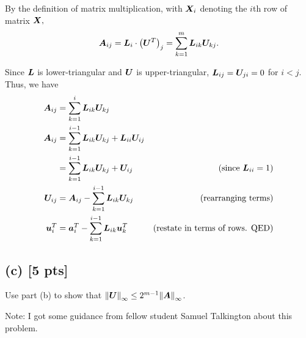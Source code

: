 \documentclass[twoside,10pt]{article}
\begin{document}
By the definition of matrix multiplication, with $\bm{X}_i$ denoting the $i$th row of matrix $\bm{X},$
$$\mtx{A}_{ij} = \mtx{L}_i\cdot\left(\mtx{U}^T\right)_j = \sum_{k=1}^m \mtx{L}_{ik}\mtx{U}_{kj}.$$

Since $\bm{L}$ is lower-triangular and $\bm{U}$ is upper-triangular, $\bm{L}_{ij} = \bm{U}_{ji} = 0$ for $i < j.$
Thus, we have
\begin{align*}
  \bm{A}_{ij} &= \sum_{k=1}^{i} \bm{L}_{ik}\bm{U}_{kj}\\
  \bm{A}_{ij} &= \sum_{k=1}^{i-1} \bm{L}_{ik}\bm{U}_{kj} + \bm{L}_{ii}\bm{U}_{ij}\\
  &= \sum_{k=1}^{i-1} \bm{L}_{ik}\bm{U}_{kj} + \bm{U}_{ij}&\text{(since $\bm{L}_{ii} = 1$)}\\
  \bm{U}_{ij} &= \bm{A}_{ij} - \sum_{k=1}^{i-1} \bm{L}_{ik}\bm{U}_{kj}&\text{(rearranging terms)}\\
  \bm{u}^T_{i} &= \bm{a}^T_{i} - \sum_{k=1}^{i-1} \bm{L}_{ik}\bm{u}^T_{k}&\text{(restate in terms of rows. QED)}
\end{align*}
\subsection*{(c) [5 pts]}
Use part (b) to show that $\left\|\mtx{U}\right\|_{\infty} \leq 2^{m - 1} \left\| \mtx{A}\right\|_{\infty}$. 

\quad Note: I got some guidance from fellow student Samuel Talkington about this problem.
\end{document}
